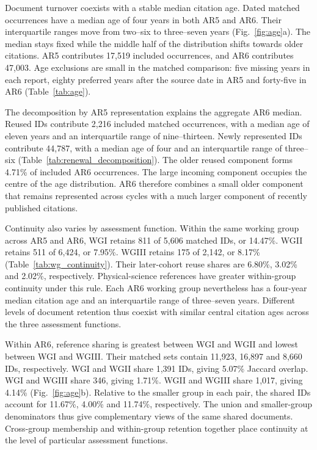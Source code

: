 \documentclass[11pt,a4paper]{article}
\begin{document}
Document turnover coexists with a stable median citation age. Dated matched occurrences have a median age of four years in both AR5 and AR6. Their interquartile ranges move from two--six to three--seven years (Fig.~\ref{fig:age}a). The median stays fixed while the middle half of the distribution shifts towards older citations. AR5 contributes 17,519 included occurrences, and AR6 contributes 47,003. Age exclusions are small in the matched comparison: five missing years in each report, eighty preferred years after the source date in AR5 and forty-five in AR6 (Table~\ref{tab:age}).

The decomposition by AR5 representation explains the aggregate AR6 median. Reused IDs contribute 2,216 included matched occurrences, with a median age of eleven years and an interquartile range of nine--thirteen. Newly represented IDs contribute 44,787, with a median age of four and an interquartile range of three--six (Table~\ref{tab:renewal_decomposition}). The older reused component forms 4.71\% of included AR6 occurrences. The large incoming component occupies the centre of the age distribution. AR6 therefore combines a small older component that remains represented across cycles with a much larger component of recently published citations.

Continuity also varies by assessment function. Within the same working group across AR5 and AR6, WGI retains 811 of 5,606 matched IDs, or 14.47\%. WGII retains 511 of 6,424, or 7.95\%. WGIII retains 175 of 2,142, or 8.17\% (Table~\ref{tab:wg_continuity}). Their later-cohort reuse shares are 6.80\%, 3.02\% and 2.02\%, respectively. Physical-science references have greater within-group continuity under this rule. Each AR6 working group nevertheless has a four-year median citation age and an interquartile range of three--seven years. Different levels of document retention thus coexist with similar central citation ages across the three assessment functions.

Within AR6, reference sharing is greatest between WGI and WGII and lowest between WGI and WGIII. Their matched sets contain 11,923, 16,897 and 8,660 IDs, respectively. WGI and WGII share 1,391 IDs, giving 5.07\% Jaccard overlap. WGI and WGIII share 346, giving 1.71\%. WGII and WGIII share 1,017, giving 4.14\% (Fig.~\ref{fig:age}b). Relative to the smaller group in each pair, the shared IDs account for 11.67\%, 4.00\% and 11.74\%, respectively. The union and smaller-group denominators thus give complementary views of the same shared documents. Cross-group membership and within-group retention together place continuity at the level of particular assessment functions.
\end{document}
